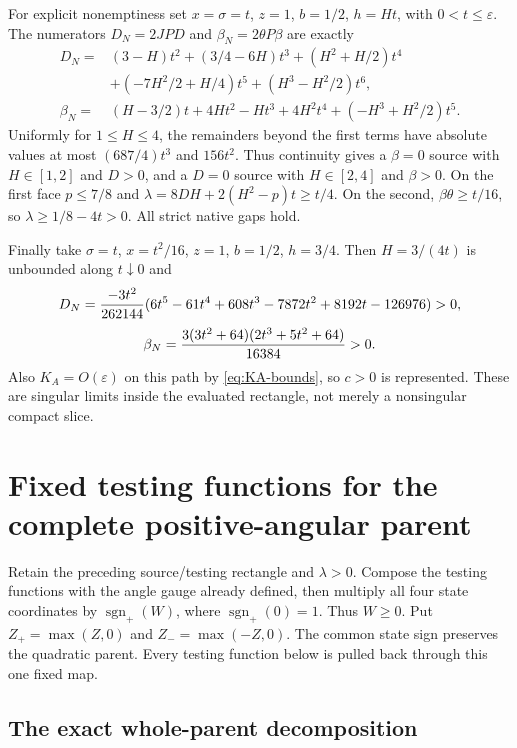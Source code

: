 \documentclass[11pt]{article}
\newcommand{\eps}{\varepsilon}
\begin{document}
For explicit nonemptiness set $x=\sigma=t$, $z=1$, $b=1/2$,
$h=Ht$, with $0<t\le\eps$. The numerators $D_N=2JPD$ and
$\beta_N=2\theta P\beta$ are exactly
\[
\begin{split}
 D_N={}&(3-H)t^2+(3/4-6H)t^3+(H^2+H/2)t^4\\
       &+(-7H^2/2+H/4)t^5+(H^3-H^2/2)t^6,\\
 \beta_N={}&(H-3/2)t+4Ht^2-Ht^3+4H^2t^4
                                      +(-H^3+H^2/2)t^5.
\end{split}
\]
Uniformly for $1\le H\le4$, the remainders beyond the first
terms have absolute values at most $(687/4)t^3$ and $156t^2$.
Thus continuity gives a $\beta=0$ source with $H\in[1,2]$ and
$D>0$, and a $D=0$ source with $H\in[2,4]$ and $\beta>0$.
On the first face $p\le7/8$ and
$\lambda=8DH+2(H^2-p)t\ge t/4$.
On the second, $\beta\theta\ge t/16$, so
$\lambda\ge1/8-4t>0$. All strict native gaps hold.

Finally take $\sigma=t$, $x=t^2/16$, $z=1$, $b=1/2$, $h=3/4$.
Then $H=3/(4t)$ is unbounded along $t\downarrow0$ and
\[
 D_N={-3t^2\over262144}
 (6t^5-61t^4+608t^3-7872t^2+8192t-126976)>0,
\]
\[
 \beta_N={3(3t^2+64)(2t^3+5t^2+64)\over16384}>0.
\]
Also $K_A=O(\eps)$ on this path by \eqref{eq:KA-bounds}, so
$c>0$ is represented. These are singular limits inside the
evaluated rectangle, not merely a nonsingular compact slice.


\section{Fixed testing functions for the complete positive-angular parent}
Retain the preceding source/testing rectangle and $\lambda>0$.
Compose the testing functions with the angle gauge already defined, then
multiply all four state coordinates by $\operatorname{sgn}_+(W)$,
where $\operatorname{sgn}_+(0)=1$. Thus $W\ge0$.
Put $Z_+=\max(Z,0)$ and $Z_-=\max(-Z,0)$. The common state sign
preserves the quadratic parent. Every testing function below is pulled
back through this one fixed map.

\subsection{The exact whole-parent decomposition}
\end{document}
